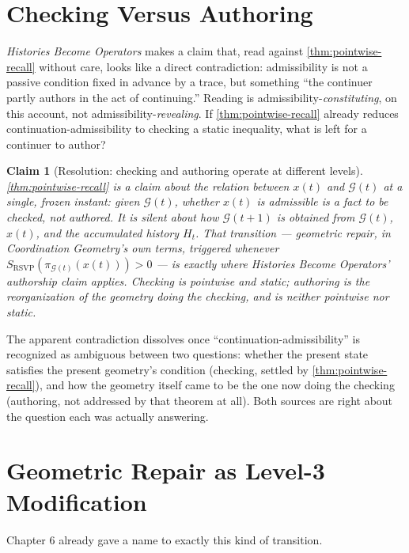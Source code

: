 \documentclass[12pt]{report}
\newtheorem{claim}[definition]{Claim}
\begin{document}
\section{Checking Versus Authoring}
\label{sec:checking-authoring}

\emph{Histories Become Operators} makes a claim that, read against
\cref{thm:pointwise-recall} without care, looks like a direct
contradiction: admissibility is not a passive condition fixed in advance
by a trace, but something ``the continuer partly authors in the act of
continuing.'' Reading is admissibility-\emph{constituting}, on this
account, not admissibility-\emph{revealing}. If \cref{thm:pointwise-recall}
already reduces continuation-admissibility to checking a static
inequality, what is left for a continuer to author?

\begin{claim}[Resolution: checking and authoring operate at different levels]
\label{claim:resolution}
\cref{thm:pointwise-recall} is a claim about the relation between $x(t)$
and $\mathcal{G}(t)$ at a single, frozen instant: given $\mathcal{G}(t)$,
whether $x(t)$ is admissible is a fact to be checked, not authored. It is
silent about how $\mathcal{G}(t+1)$ is obtained from $\mathcal{G}(t)$,
$x(t)$, and the accumulated history $H_t$. That transition --- geometric
repair, in \emph{Coordination Geometry}'s own terms, triggered whenever
$S_{\mathrm{RSVP}}(\pi_{\mathcal{G}(t)}(x(t))) > 0$ --- is exactly where
\emph{Histories Become Operators}' authorship claim applies. Checking is
pointwise and static; authoring is the reorganization of the geometry
doing the checking, and is neither pointwise nor static.
\end{claim}

The apparent contradiction dissolves once ``continuation-admissibility''
is recognized as ambiguous between two questions: whether the present
state satisfies the present geometry's condition (checking, settled by
\cref{thm:pointwise-recall}), and how the geometry itself came to be the
one now doing the checking (authoring, not addressed by that theorem at
all). Both sources are right about the question each was actually
answering.

\section{Geometric Repair as Level-3 Modification}
\label{sec:level-3}

Chapter 6 already gave a name to exactly this kind of transition.
\end{document}
